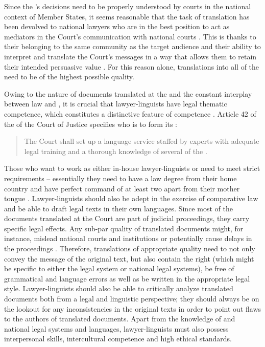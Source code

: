 \documentclass[output=paper]{langsci/langscibook}
\begin{document}
Since the ’s decisions need to be properly understood by courts in the national context of Member States, it seems reasonable that the task of translation has been devolved to national lawyers who are in the best position to act as mediators in the Court’s communication with national courts \citep[85–86]{Łachacz2013}. This is thanks to their belonging to the same community as the target audience and their ability to interpret and translate the Court’s messages in a way that allows them to retain their intended persuasive value \citep{Łachacz2013}. For this reason alone, translations into all of the  need to be of the highest possible quality.

Owing to the nature of documents translated at the  and the constant interplay between law and , it is crucial that lawyer-linguists have legal thematic competence, which constitutes a distinctive feature of  competence \citep[11]{PrietoRamos2011}. Article 42 of the  of the Court of Justice specifies who is to form its :
\begin{quote}
The Court shall set up a language service staffed by experts with adequate legal training and a thorough knowledge of several  of the .
\end{quote}

Those who want to work as either in-house lawyer-linguists or  need to meet strict requirements – essentially they need to have a law degree from their home country and have perfect command of at least two  apart from their mother tongue \citep[10]{McAuliffe2016}. Lawyer-linguists should also be adept in the exercise of comparative law and be able to draft legal texts in their own languages. Since most of the documents translated at the Court are part of judicial proceedings, they carry specific legal effects. Any sub-par quality of translated documents might, for instance, mislead national courts and institutions or potentially cause delays in the proceedings \citep[9]{Izzo2014a}. Therefore, translations of appropriate quality need to not only convey the message of the original text, but also contain the right  (which might be specific to either the  legal system or national legal systems), be free of grammatical and language errors as well as be written in the appropriate legal style. Lawyer-linguists should also be able to critically analyze translated documents both from a legal and linguistic perspective; they should always be on the lookout for any inconsistencies in the original texts in order to point out flaws to the authors of translated documents. Apart from the knowledge of  and national legal systems and languages, lawyer-linguists must also possess interpersonal skills, intercultural competence and high ethical standards.
\end{document}
